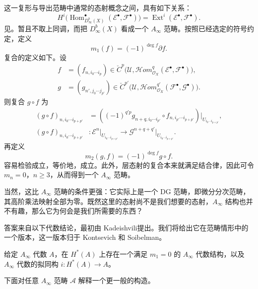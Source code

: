 这一复形与导出范畴中通常的态射概念之间，具有如下关系：
\[
H^i\bigl(\operatorname{Hom}^\bullet_{D^b_\infty(X)}
(\mathcal E^\bullet,\mathcal F^\bullet)\bigr)
=\operatorname{Ext}^i(\mathcal E^\bullet,\mathcal F^\bullet).
\]
见。暂且不取上同调，而把 $D^b_\infty(X)$ 看成一个 $A_\infty$ 范畴。按照已经选定的符号约定，定义
\[
m_1(f)=(-1)^{\deg f}\partial f.
\]
复合的定义如下。设
\[
\begin{aligned}
f&=(f_{n,i_0\cdots i_p})\in
\check C^p\bigl(\mathcal U,
\mathcal{H}om^q_{\mathcal O_X}(\mathcal E^\bullet,\mathcal F^\bullet)\bigr),\\
g&=(g_{n',j_0\cdots j_{p'}})\in
\check C^{p'}\bigl(\mathcal U,
\mathcal{H}om^{q'}_{\mathcal O_X}(\mathcal F^\bullet,\mathcal G^\bullet)\bigr).
\end{aligned}
\]
则复合 $g\circ f$ 为
\[
\begin{aligned}
(g\circ f)_{n,i_0\cdots i_{p+p'}}
&=\left((-1)^{q'p}
 g_{n+q,i_0\cdots i_{p'}}\circ
 f_{n,i_{p'}\cdots i_{p+p'}}\right)
 \big|_{U_{i_0\cdots i_{p+p'}}},\\
(g\circ f)_{n,i_0\cdots i_{p+p'}}&\colon
\mathcal E^n\big|_{U_{i_0\cdots i_{p+p'}}}
\longrightarrow
\mathcal G^{n+q+q'}\big|_{U_{i_0\cdots i_{p+p'}}}.
\end{aligned}
\]
再定义
\[
m_2(g,f)=(-1)^{\deg f}g\circ f.
\]
容易检验成立，等价地，成立。此外，层态射的复合本来就满足结合律，因此可令 $m_n=0$，$n\geq3$，从而得到一个 $A_\infty$ 范畴。

当然，这比 $A_\infty$ 范畴的条件更强：它实际上是一个 DG 范畴，即微分分次范畴，其高阶乘法映射全部为零。既然这里的态射尚不是我们想要的态射，$A_\infty$ 结构也并不有趣，那么它为何会是我们所需要的东西？

答案来自以下代数结论，最初由 Kadeishvili提出。我们将给出它在范畴情形中的一个版本，这一版本归于 Kontsevich 和 Soibelman。

\begin{theorem}\label{thm:8.7}
给定 $A_\infty$ 代数 $A$，在 $H^*(A)$ 上存在一个满足 $m_1=0$ 的 $A_\infty$ 代数结构，以及 $A_\infty$ 代数的拟同构 $i\colon H^*(A)\to A$。
\end{theorem}

下面对任意 $A_\infty$ 范畴 $\mathcal A$ 解释一个更一般的构造。

